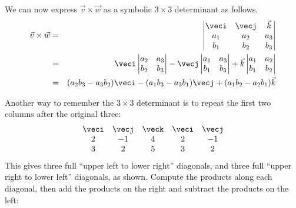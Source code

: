 We can now express $\vec{v} \times \vec{w}$ as a symbolic $3 \times 3$ determinant as follows.
\begin{eqnarray*}
\vec{v} \times \vec{w} & = & 
\begin{vmatrix}
\veci & \vecj & \vec{k} \\
a_1 & a_2 & a_3 \\
b_1 & b_2 & b_3 
\end{vmatrix} \\
& = &
\veci \begin{vmatrix}a_2 & a_3 \\b_2 & b_3\end{vmatrix}
-\vecj \begin{vmatrix}a_1 & a_3 \\b_1 & b_3\end{vmatrix}
+\vec{k} \begin{vmatrix}a_1 & a_2 \\b_1 & b_2\end{vmatrix} \\
& = & (a_2 b_3 - a_3 b_2) \veci
- (a_1 b_3 - a_3 b_1) \vecj
+ (a_1 b_2 - a_2 b_1) \vec{k}
\end{eqnarray*}



Another way to remember the $3\times3$ determinant is to
repeat the first two columns after the original three:
\[
 \begin{matrix}
  \veci&\vecj&\veck&\veci&\vecj \\
  2&-1&4&2&-1\\
  3&2&5&3&2
 \end{matrix}
\]
This gives three full ``upper left to lower right'' diagonals, and three full ``upper right to lower left'' diagonals, as shown. Compute the products along each diagonal, then add the products on the right and subtract the products on the left:


